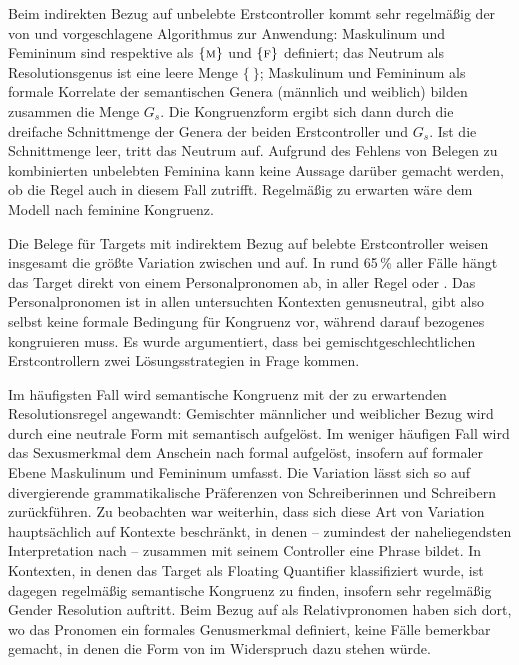 Beim indirekten Bezug auf unbelebte Erstcontroller kommt sehr regelmäßig der
von \citet[577]{wechsler2009} und \citet[184]{wechslerzlatic2003}
vorgeschlagene Algorithmus zur Anwendung: Maskulinum und Femininum sind
respektive als $\{\textsc{m}\}$ und $\{\textsc{f}\}$ definiert; das Neutrum als
Resolutionsgenus ist eine leere Menge $\{\ \}$; Maskulinum und Femininum als
formale Korrelate der semantischen Genera (männlich und weiblich) bilden
zusammen die Menge $G_s$. Die Kongruenzform ergibt sich dann durch die
dreifache Schnittmenge der Genera der beiden Erstcontroller und $G_s$. Ist die
Schnittmenge leer, tritt das Neutrum auf. Aufgrund des Fehlens von Belegen zu
kombinierten unbelebten Feminina kann keine Aussage darüber gemacht werden, ob
die Regel auch in diesem Fall zutrifft. Regelmäßig zu erwarten wäre dem Modell
nach feminine Kongruenz.

Die Belege für Targets mit indirektem Bezug auf belebte Erstcontroller weisen
insgesamt die größte Variation zwischen  und  auf. In
rund 65\,\% aller Fälle hängt das Target direkt von einem Personalpronomen ab,
in aller Regel  oder . Das Personalpronomen ist in allen
untersuchten Kontexten genusneutral, gibt also selbst keine formale Bedingung
für Kongruenz vor, während darauf bezogenes  kongruieren muss. Es
wurde argumentiert, dass bei gemischtgeschlechtlichen Erstcontrollern zwei
Lösungsstrategien in Frage kommen.

Im häufigsten Fall wird semantische Kongruenz mit der zu erwartenden
Resolutionsregel angewandt: Gemischter männlicher und weiblicher Bezug wird
durch eine neutrale Form mit \mbox{} semantisch aufgelöst. Im weniger
häufigen Fall wird das Sexusmerkmal dem Anschein nach formal aufgelöst,
insofern  auf formaler Ebene Maskulinum und Femininum umfasst. Die
Variation lässt sich so auf divergierende grammatikalische Präferenzen von
Schreiberinnen und Schreibern zurück\-führen. Zu beobachten war weiterhin, dass
sich diese Art von Variation hauptsächlich auf Kontexte beschränkt, in denen
 -- zumindest der naheliegendsten Interpretation nach -- zusammen
mit seinem Controller eine Phrase bildet. In Kontexten, in denen das Target als
Floating Quantifier klassifiziert wurde, ist dagegen regelmäßig semantische
Kongruenz zu finden, insofern sehr regelmäßig Gender Resolution auftritt. Beim
Bezug auf  als Relativpronomen haben sich dort, wo das Pronomen
ein formales Genusmerkmal definiert, keine Fälle bemerkbar gemacht, in denen
die Form von  im Widerspruch dazu stehen würde.

